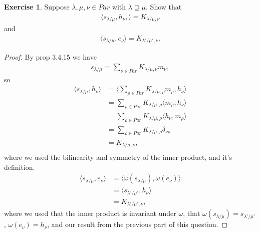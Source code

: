 \documentclass[12pt]{extarticle}
\newcommand{\<}{\langle}
\renewcommand{\>}{\rangle}
\theoremstyle{definition}
\newtheorem{exercise}{Exercise}
\begin{document}
\begin{exercise}
  Suppose $\lambda, \mu, \nu \in Par$ with $\lambda \supseteq \mu$. Show that
  \begin{align*}
    \< s_{\lambda / \mu}, h_{\nu}, \> = K_{\lambda/\mu, \nu}
  \end{align*}
  and
  \begin{align*}
    \< s_{\lambda / \mu}, e_{\nu} \> = K_{\lambda' / \mu', \nu}.
  \end{align*}
\end{exercise}
\begin{proof}
  By prop 3.4.15 we have
  \begin{align*}
    s_{\lambda/\mu} = \sum\limits_{\nu \in Par} K_{\lambda/\mu, \nu} m_{\nu},
  \end{align*}
  so
  \begin{align*}
    \< s_{\lambda / \mu}, h_{\nu} \>
    &= \< \sum\limits_{\rho \in Par} K_{\lambda/\mu, \rho} m_{\rho} , h_{\nu} \> \\
    &= \sum\limits_{\rho \in Par} K_{\lambda/\mu, \rho} \< m_{\rho} , h_{\nu} \> \\
    &= \sum\limits_{\rho \in Par} K_{\lambda/\mu, \rho} \< h_{\nu},  m_{\rho} \> \\
    &= \sum\limits_{\rho \in Par} K_{\lambda/\mu, \rho} \delta_{\nu \rho} \\
    &= K_{\lambda/\mu, \nu}, \\    
  \end{align*}
  where we used the bilinearity and symmetry of the inner product, and it's definition.
  \begin{align*}
    \< s_{\lambda / \mu}, e_{\nu} \>
    &= \< \omega(s_{\lambda / \mu}), \omega(e_{\nu}) \> \\
    &= \< s_{\lambda' / \mu'}, h_{\nu} \> \\
    &= K_{\lambda' / \mu', \nu},
  \end{align*}
  where we used that the inner product is invariant under $\omega$, that $\omega(s_{\lambda/\mu}) = s_{\lambda'/\mu'}$,  $\omega(e_{\nu}) = h_{\nu}$, and our result from the previous part of this question.
\end{proof}
\end{document}
